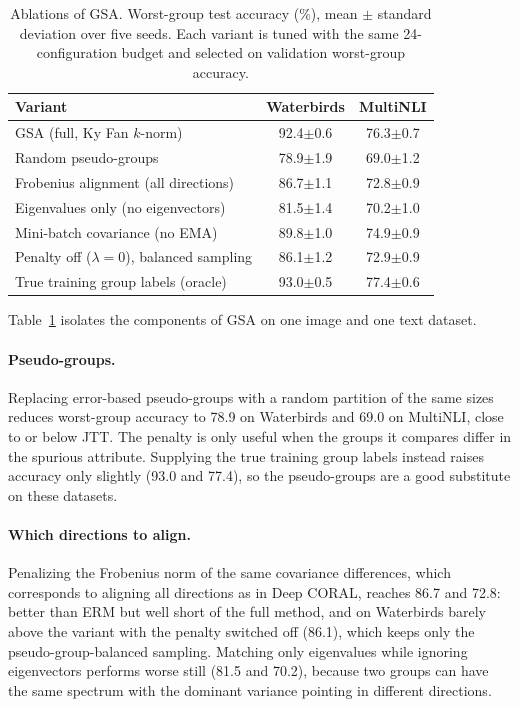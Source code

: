 \documentclass{article}
\begin{document}
\begin{table}[t]
\centering
\caption{Ablations of GSA. Worst-group test accuracy (\%), mean $\pm$ standard deviation over five seeds. Each variant is tuned with the same 24-configuration budget and selected on validation worst-group accuracy.}
\label{tab:ablation}
\small
\begin{tabular}{lcc}
\toprule
Variant & Waterbirds & MultiNLI \\
\midrule
GSA (full, Ky Fan $k$-norm) & 92.4$\pm$0.6 & 76.3$\pm$0.7 \\
Random pseudo-groups & 78.9$\pm$1.9 & 69.0$\pm$1.2 \\
Frobenius alignment (all directions) & 86.7$\pm$1.1 & 72.8$\pm$0.9 \\
Eigenvalues only (no eigenvectors) & 81.5$\pm$1.4 & 70.2$\pm$1.0 \\
Mini-batch covariance (no EMA) & 89.8$\pm$1.0 & 74.9$\pm$0.9 \\
Penalty off ($\lambda = 0$), balanced sampling & 86.1$\pm$1.2 & 72.9$\pm$0.9 \\
\midrule
True training group labels (oracle) & 93.0$\pm$0.5 & 77.4$\pm$0.6 \\
\bottomrule
\end{tabular}
\end{table}

Table~\ref{tab:ablation} isolates the components of GSA on one image and one text dataset.

\paragraph{Pseudo-groups.}
Replacing error-based pseudo-groups with a random partition of the same sizes reduces worst-group accuracy to 78.9 on Waterbirds and 69.0 on MultiNLI, close to or below JTT. The penalty is only useful when the groups it compares differ in the spurious attribute. Supplying the true training group labels instead raises accuracy only slightly (93.0 and 77.4), so the pseudo-groups are a good substitute on these datasets.

\paragraph{Which directions to align.}
Penalizing the Frobenius norm of the same covariance differences, which corresponds to aligning all directions as in Deep CORAL, reaches 86.7 and 72.8: better than ERM but well short of the full method, and on Waterbirds barely above the variant with the penalty switched off (86.1), which keeps only the pseudo-group-balanced sampling. Matching only eigenvalues while ignoring eigenvectors performs worse still (81.5 and 70.2), because two groups can have the same spectrum with the dominant variance pointing in different directions.
\end{document}
